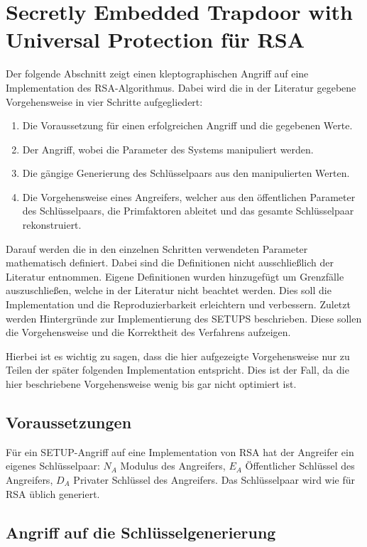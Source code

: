     \section{Secretly Embedded Trapdoor with Universal Protection für RSA}
        Der folgende Abschnitt zeigt einen kleptographischen Angriff auf eine Implementation des \ac{RSA}-Algorithmus. Dabei wird die in der Literatur gegebene Vorgehensweise in vier Schritte aufgegliedert:
        \begin{enumerate}
            \item Die Voraussetzung für einen erfolgreichen Angriff und die gegebenen Werte.
            \item Der Angriff, wobei die Parameter des Systems manipuliert werden.
            \item Die gängige Generierung des Schlüsselpaars aus den manipulierten Werten.
            \item Die Vorgehensweise eines Angreifers, welcher aus den öffentlichen Parameter des Schlüsselpaars, die Primfaktoren ableitet und das gesamte Schlüsselpaar rekonstruiert.
        \end{enumerate}
        Darauf werden die in den einzelnen Schritten verwendeten Parameter mathematisch definiert. Dabei sind die Definitionen nicht ausschließlich der Literatur entnommen. Eigene Definitionen wurden hinzugefügt um Grenzfälle auszuschließen, welche in der Literatur nicht beachtet werden. Dies soll die Implementation und die Reproduzierbarkeit erleichtern und verbessern. 
        Zuletzt werden Hintergründe zur Implementierung des SETUPS beschrieben. Diese sollen die Vorgehensweise und die Korrektheit des Verfahrens aufzeigen.

        Hierbei ist es wichtig zu sagen, dass die hier aufgezeigte Vorgehensweise nur zu Teilen der später folgenden Implementation entspricht. Dies ist der Fall, da die hier beschriebene Vorgehensweise wenig bis gar nicht optimiert ist.

        \subsection{Voraussetzungen}
            Für ein \ac{SETUP}-Angriff auf eine Implementation von \ac{RSA} hat der Angreifer ein eigenes Schlüsselpaar: $N_{A}$ Modulus des Angreifers, $E_{A}$ Öffentlicher Schlüssel des Angreifers, $D_{A}$ Privater Schlüssel des Angreifers. Das Schlüsselpaar wird wie für \ac{RSA} üblich generiert.
        
        \subsection{Angriff auf die Schlüsselgenerierung}
